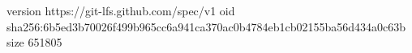 version https://git-lfs.github.com/spec/v1
oid sha256:6b5ed3b70026f499b965cc6a941ca370ac0b4784eb1cb02155ba56d434a0c63b
size 651805
